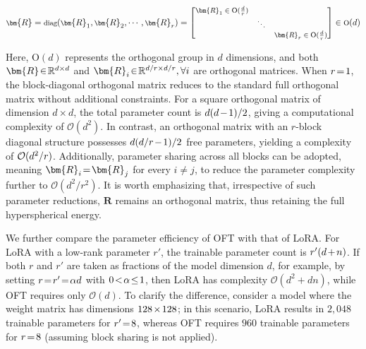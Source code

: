 \begin{equation}
    \footnotesize
    \bm{R} = \text{diag}(\bm{R}_1, \bm{R}_2, \cdots, \bm{R}_r) = \begin{bmatrix}
    \bm{R}_1 \in \text{O}(\frac{d}{r}) &  &\\
    &\ddots & \\
    & & \bm{R}_r \in \text{O}(\frac{d}{r})
    \end{bmatrix} \in \text{O}(d)
\end{equation}

Here, $\text{O}(d)$ represents the orthogonal group in $d$ dimensions, and both $\thickmuskip=2mu \medmuskip=2mu \bm{R}\in\mathbb{R}^{d\times d}$ and $\thickmuskip=2mu \medmuskip=2mu \bm{R}_i\in\mathbb{R}^{d/r\times d/r},\forall i$ are orthogonal matrices. When $\thickmuskip=2mu \medmuskip=2mu r=1$, the block-diagonal orthogonal matrix reduces to the standard full orthogonal matrix without additional constraints. For a square orthogonal matrix of dimension $d\times d$, the total parameter count is $\thickmuskip=2mu \medmuskip=2mu d(d-1)/2$, giving a computational complexity of $\mathcal{O}(d^2)$. In contrast, an orthogonal matrix with an $r$-block diagonal structure possesses $\thickmuskip=2mu \medmuskip=2mu d(d/r-1)/2$ free parameters, yielding a complexity of $\thickmuskip=2mu \medmuskip=2mu \mathcal{O}(d^2/r)$. Additionally, parameter sharing across all blocks can be adopted, meaning $\thickmuskip=2mu \medmuskip=2mu\bm{R}_i=\bm{R}_j$ for every $i\neq j$, to reduce the parameter complexity further to $\mathcal{O}(d^2/r^2)$. It is worth emphasizing that, irrespective of such parameter reductions, $\bm{R}$ remains an orthogonal matrix, thus retaining the full hyperspherical energy.

We further compare the parameter efficiency of OFT with that of LoRA. For LoRA with a low-rank parameter $r'$, the trainable parameter count is $\thickmuskip=2mu \medmuskip=2mu r'(d+n)$. If both $r$ and $r'$ are taken as fractions of the model dimension $d$, for example, by setting $\thickmuskip=2mu \medmuskip=2mu r=r'=\alpha d$ with $\thickmuskip=2mu \medmuskip=2mu 0<\alpha\leq 1$, then LoRA has complexity $\mathcal{O}(d^2+dn)$, while OFT requires only $\mathcal{O}(d)$. To clarify the difference, consider a model where the weight matrix has dimensions $\thickmuskip=2mu \medmuskip=2mu 128\times 128$; in this scenario, LoRA results in $2,048$ trainable parameters for $\thickmuskip=2mu \medmuskip=2mu r'=8$, whereas OFT requires $960$ trainable parameters for $\thickmuskip=2mu \medmuskip=2mu r=8$ (assuming block sharing is not applied).

